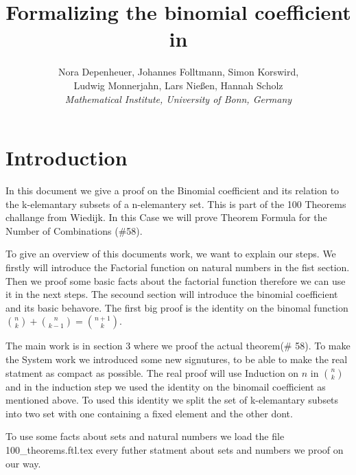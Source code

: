 \documentclass{article}
\begin{document}
\newcommand{\Prod}[3]{#1_{#2} \cdots #1_{#3}}
\newcommand{\Seq}[2]{\{#1,\dots,#2\}}
\newcommand{\FinSet}[3]{\{#1_{#2},\dots,#1_{#3}\}}
\newcommand{\Primes}{\mathbb{P}}
\newcommand{\pow}{{\cal P}}
\newcommand{\range}{\operatorname{ran}}
\newcommand{\inv}[1]{#1^{-1}}
\newcommand{\sset}[2]{\{#1\}_{#2}}

\title{Formalizing the binomial coefficient in \Naproche{}}

\author{Nora Depenheuer, Johannes Folltmann, Simon Korswird,\\
Ludwig Monnerjahn, Lars Nießen, Hannah Scholz\\
\emph{Mathematical Institute, University of Bonn, Germany}
}

\maketitle

\section{Introduction}
In this document we give a proof on the Binomial coefficient and its relation to the k-elemantary subsets of a n-elemantery set.
This is part of the 100 Theorems challange from Wiedijk. In this Case we will prove Theorem Formula for the Number of Combinations
(\#58). 

To give an overview of this documents work, we want to explain our steps. We firstly will introduce the Factorial function on natural numbers in the fist section.
Then we proof some basic facts about the factorial function therefore we can use it in the next steps. The secound section will introduce 
the binomial coefficient and its basic behavore. The first big proof is the identity on the binomal function $\binom{n}{k} + \binom{n}{k-1} = \binom{n+1}{k}$.

The main work is in section 3 where we proof the actual theorem(\# 58). To make the \Naproche System work we introduced some new signutures, 
to be able to make the real statment as compact as possible. The real proof will use Induction on $n$ in $\binom{n}{k}$ 
and in the induction step we used the identity on the binomail coefficient as mentioned above. To used this identity we split the set of k-elemantary subsets
into two set with one containing a fixed element and the other dont. 

To use some facts about sets and natural numbers we load the file 100\_theorems.ftl.tex every futher statment about sets and numbers we proof on our way.
\begin{forthel}
\end{forthel}
\end{document}
